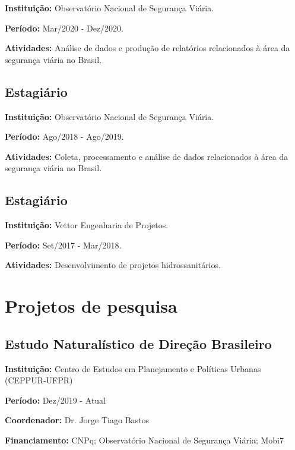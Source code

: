\documentclass[12pt, a4paper]{article}
\begin{document}
\textbf{Instituição:} Observatório Nacional de Segurança Viária.

\textbf{Período:} Mar/2020 - Dez/2020.

\textbf{Atividades:} Análise de dados e produção de relatórios relacionados à área da segurança viária no Brasil.

\subsection{Estagiário}

\textbf{Instituição:} Observatório Nacional de Segurança Viária.

\textbf{Período:} Ago/2018 - Ago/2019.

\textbf{Atividades:} Coleta, processamento e análise de dados relacionados à área da segurança viária no Brasil.

\subsection{Estagiário}

\textbf{Instituição:} Vettor Engenharia de Projetos.

\textbf{Período:} Set/2017 - Mar/2018.

\textbf{Atividades:} Desenvolvimento de projetos hidrossanitários.

\section{Projetos de pesquisa}

\subsection{Estudo Naturalístico de Direção Brasileiro}

\textbf{Instituição:} Centro de Estudos em Planejamento e Políticas Urbanas (CEPPUR-UFPR)

\textbf{Período:} Dez/2019 - Atual

\textbf{Coordenador:} Dr. Jorge Tiago Bastos

\textbf{Financiamento:} CNPq; Observatório Nacional de Segurança Viária; Mobi7


\end{document}
